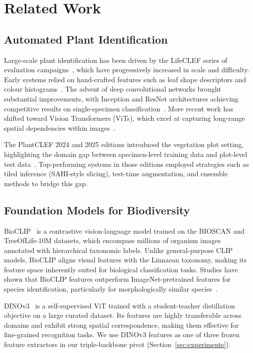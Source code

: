 \section{Related Work}
\label{sec:related}

\subsection{Automated Plant Identification}

Large-scale plant identification has been driven by the LifeCLEF series of evaluation campaigns~\cite{joly2024overview}, which have progressively increased in scale and difficulty. Early systems relied on hand-crafted features such as leaf shape descriptors and colour histograms~\cite{goeau2013pl}. The advent of deep convolutional networks brought substantial improvements, with Inception and ResNet architectures achieving competitive results on single-specimen classification~\cite{lee2017deep}. More recent work has shifted toward Vision Transformers (ViTs), which excel at capturing long-range spatial dependencies within images~\cite{dosovitskiy2021image}.

The PlantCLEF 2024 and 2025 editions introduced the vegetation plot setting, highlighting the domain gap between specimen-level training data and plot-level test data~\cite{goeau2024plantclef}. Top-performing systems in those editions employed strategies such as tiled inference (SAHI-style slicing), test-time augmentation, and ensemble methods to bridge this gap.

\subsection{Foundation Models for Biodiversity}

BioCLIP~\cite{stevens2024bioclip} is a contrastive vision-language model trained on the BIOSCAN and TreeOfLife-10M datasets, which encompass millions of organism images annotated with hierarchical taxonomic labels. Unlike general-purpose CLIP models, BioCLIP aligns visual features with the Linnaean taxonomy, making its feature space inherently suited for biological classification tasks. Studies have shown that BioCLIP features outperform ImageNet-pretrained features for species identification, particularly for morphologically similar species~\cite{stevens2024bioclip}.

DINOv3~\cite{simeoni2025dinov3} is a self-supervised ViT trained with a student-teacher distillation objective on a large curated dataset. Its features are highly transferable across domains and exhibit strong spatial correspondence, making them effective for fine-grained recognition tasks. We use DINOv3 features as one of three frozen feature extractors in our triple-backbone pivot (Section~\ref{sec:experiments}).

